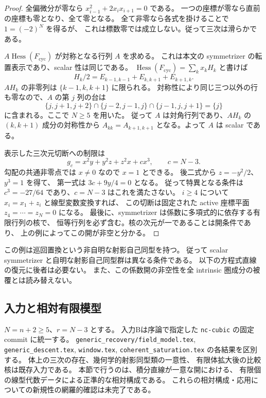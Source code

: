 \begin{proof}
全偏微分が零なら
$x_{i-1}^2+2x_ix_{i+1}=0$ である。
一つの座標が零なら直前の座標も零となり、全て零となる。
全て非零なら各式を掛けることで $1=(-2)^N$ を得るが、
これは標数零では成立しない。従って三次は滑らかである。

$A\operatorname{Hess}(F_{\mathrm{cyc}})$ が対称となる行列 $A$ を求める。
これは本文の symmetrizer の転置表示であり、scalar 性は同じである。
$\operatorname{Hess}(F_{\mathrm{cyc}})=\sum_kx_kH_k$ と書けば
\[
 H_k/2=E_{k-1,k-1}+E_{k,k+1}+E_{k+1,k}.
\]
$AH_k$ の非零列は $\{k-1,k,k+1\}$ に限られる。
対称性により同じ三つ以外の行も零なので、$A$ の第 $j$ 列の台は
\[
 \{j,j+1,j+2\}\cap\{j-2,j-1,j\}\cap\{j-1,j,j+1\}
 =\{j\}
\]
に含まれる。ここで $N\ge5$ を用いた。
従って $A$ は対角行列であり、$AH_k$ の $(k,k+1)$ 成分の対称性から
$A_{kk}=A_{k+1,k+1}$ となる。よって $A$ は scalar である。

表示した三次元切断への制限は
\[
 g_c=x^2y+y^2z+z^2x+cx^3,\qquad c=N-3.
\]
勾配の共通非零点では $x\ne0$ なので $x=1$ とできる。
後二式から $z=-y^2/2$、$y^3=1$ を得て、
第一式は $3c+9y/4=0$ となる。
従って特異となる条件は $c^3=-27/64$ であり、$c=N-3$ はこれを満たさない。
$i\ge4$ について $x_i=x_1+z_i$ と線型変数変換すれば、
この切断は固定された active 座標平面 $z_4=\cdots=z_N=0$ になる。
最後に、symmetrizer は係数に多項式的に依存する有限行列の核で、
恒等行列を必ず含む。核の次元が一であることは開条件であり、
上の例によってこの開が非空と分かる。
\end{proof}

\begin{remark}
この例は巡回置換という非自明な射影自己同型を持つ。
従って scalar symmetrizer と自明な射影自己同型群は異なる条件である。
以下の方程式直線の復元に後者は必要ない。
また、この係数開の非空性を全 intrinsic 圏成分の被覆とは読み替えない。
\end{remark}


\subsection{入力と相対有限模型}

$N=n+2\ge5$、$r=N-3$ とする。
入力Bは序論で指定した \texttt{nc-cubic} の固定 commit に統一する。
\texttt{generic\_recovery/field\_model.tex},
\texttt{generic\_descent.tex}, \texttt{window.tex},
\texttt{coherent\_saturation.tex} の各結果を区別する。
体上の三次の存在、幾何学的射影同型類の一意性、
有限体拡大後の比較核は既存入力である。
本節で行うのは、積分直線が一意な開における、
有限個の線型代数データによる正準的な相対構成である。
これらの相対構成・応用についての新規性の網羅的確認は未完了である。

